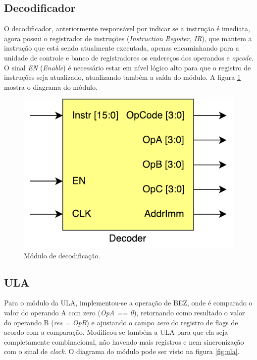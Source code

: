 \documentclass[11pt,a4paper,titlepage]{article}
\begin{document}
\subsection{Decodificador}\label{subsec:imp-decode}

O decodificador, anteriormente responsável por indicar se a instrução é imediata, agora possui o registrador de instruções (\textit{Instruction Register, IR}), que mantem a instrução que está sendo atualmente executada, apenas encaminhando para a unidade de controle e banco de registradores os endereços dos operandos e \textit{opcode}. O sinal \textit{EN} (\textit{Enable}) é necessário estar em nível lógico alto para que o registro de instruções seja atualizado, atualizando também a saída do módulo. A figura \ref{fig:decoder} mostra o diagrama do módulo.

\begin{figure}[!h]
\centering
\includegraphics[scale=0.5]{images/Decoder.pdf}
\caption{Módulo de decodificação.}
\label{fig:decoder}
\end{figure}

\subsection{ULA}\label{subsec:imp-ula}

Para o módulo da ULA, implementou-se a operação de BEZ, onde é comparado o valor do operando A com zero (\textit{OpA == 0}), retornando como resultado o valor do operando B (\textit{res = OpB}) e ajustando o campo \textit{zero} do registro de flags de acordo com a comparação. Modificou-se também a ULA para que ela seja completamente combinacional, não havendo mais registros e nem sincronização com o sinal de \textit{clock}. O diagrama do módulo pode ser visto na figura \ref{fig:ula}.
\end{document}
